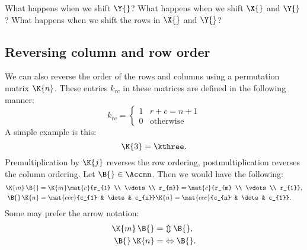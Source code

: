 What happens when we shift $\Y{}$? What happens when we shift $\X{}$ and $\Y{}$? What happens when we shift the rows in $\X{}$ and $\Y{}$?


\subsection{Reversing column and row order}
We can also reverse the order of the rows and columns using a permutation matrix $\K{n}$. These entries $k_{rc}$ in these matrices are defined in the following manner:
\begin{equation}
  k_{rc} = 
  \begin{cases}
  1 & r + c = n + 1\\
  0 & \text{otherwise}
  \end{cases}
\end{equation}
A simple example is this:
\begin{equation}
  \K{3} = \kthree.
\end{equation}
Premultiplication by $\K{j}$ reverses the row ordering, postmultiplication reverses the column ordering. Let $\B{}\in\Accmn$. Then we would have the following:
\begin{equation}
  \begin{split}
    \K{m}\,\B{} & = \K{m} 
    \mat{c}{r_{1} \\ \vdots \\ r_{m}} = 
    \mat{c}{r_{m} \\ \vdots \\ r_{1}}, \\
    \B{}\,\K{n} & =  
    \mat{ccc}{c_{1} & \dots & c_{n}}\K{n} = 
    \mat{ccc}{c_{n} & \dots & c_{1}}.
  \end{split}
\end{equation}
Some may prefer the arrow notation:
\begin{equation}
  \begin{split}
    \K{m}\,\B{} & = \ \Updownarrow \B{}, \\
    \B{}\,\K{n} & = \ \Leftrightarrow \B{}.
  \end{split}
\end{equation}


\clearpage
\break

